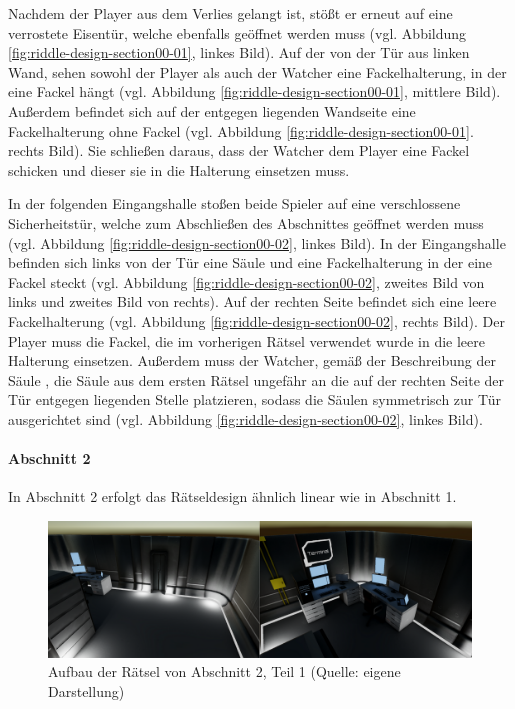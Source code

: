 Nachdem der Player aus dem Verlies gelangt ist, stößt er erneut auf eine verrostete Eisentür, welche ebenfalls geöffnet werden muss (vgl. Abbildung \ref{fig:riddle-design-section00-01}, linkes Bild). Auf der von der Tür aus linken Wand, sehen sowohl der Player als auch der Watcher eine Fackelhalterung, in der eine Fackel hängt (vgl. Abbildung \ref{fig:riddle-design-section00-01}, mittlere Bild). Außerdem befindet sich auf der entgegen liegenden Wandseite eine Fackelhalterung ohne Fackel (vgl. Abbildung \ref{fig:riddle-design-section00-01}. rechts Bild). Sie schließen daraus, dass der Watcher dem Player eine Fackel schicken und dieser sie in die Halterung einsetzen muss.

In der folgenden Eingangshalle stoßen beide Spieler auf eine verschlossene Sicherheitstür, welche zum Abschließen des Abschnittes geöffnet werden muss (vgl. Abbildung \ref{fig:riddle-design-section00-02}, linkes Bild). In der Eingangshalle befinden sich links von der Tür eine Säule und eine Fackelhalterung in der eine Fackel steckt (vgl. Abbildung \ref{fig:riddle-design-section00-02}, zweites Bild von links und zweites Bild von rechts). Auf der rechten Seite befindet sich eine leere Fackelhalterung (vgl. Abbildung \ref{fig:riddle-design-section00-02}, rechts Bild). Der Player muss die Fackel, die im vorherigen Rätsel verwendet wurde in die leere Halterung einsetzen. Außerdem muss der Watcher, gemäß der Beschreibung der Säule , die Säule aus dem ersten Rätsel ungefähr an die auf der rechten Seite der Tür entgegen liegenden Stelle platzieren, sodass die Säulen symmetrisch zur Tür ausgerichtet sind (vgl. Abbildung \ref{fig:riddle-design-section00-02}, linkes Bild).

\paragraph{Abschnitt 2}
In Abschnitt 2 erfolgt das Rätseldesign ähnlich linear wie in Abschnitt 1.

\begin{figure}[ht]
\centering
\includegraphics[width=1\linewidth]{content/pictures/Rätseldesign - Abschnitt01 - Rätsel00.png}
\caption{Aufbau der Rätsel von Abschnitt 2, Teil 1 (Quelle: eigene Darstellung)}
\label{fig:riddle-design-section01-00}
\end{figure}

